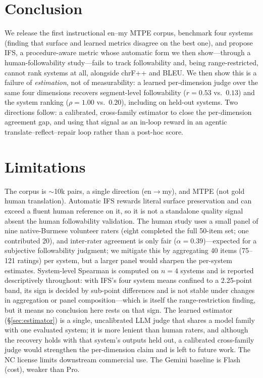 \documentclass[11pt]{article}
\begin{document}
\section{Conclusion}\label{sec:concl}
We release the first instructional en--my MTPE corpus, benchmark four systems (finding that
surface and learned metrics disagree on the best one), and propose IFS, a procedure-aware
metric whose automatic form we then show---through a human-followability study---fails to track
followability and, being range-restricted, cannot rank systems at all, alongside chrF++ and BLEU.
We then show this is a
failure of \emph{estimation}, not of measurability: a learned per-dimension judge over the same
four dimensions recovers segment-level followability ($r{=}0.53$ vs.\ $0.13$) and the system
ranking ($\rho{=}1.00$ vs.\ $0.20$), including on held-out systems. Two directions follow: a
calibrated, cross-family estimator to close the per-dimension agreement gap, and using that
signal as an in-loop reward in an agentic translate--reflect--repair loop rather than a post-hoc
score.

\section*{Limitations}
The corpus is $\sim$10k pairs, a single direction (en$\rightarrow$my), and MTPE (not gold
human translation). Automatic IFS rewards literal surface preservation and can exceed a
fluent human reference on it, so it is not a standalone quality signal absent the human
followability validation. The human study uses a small panel of nine native-Burmese
volunteer raters (eight completed the full 50-item set; one contributed 20), and inter-rater
agreement is only fair ($\alpha{=}0.39$)---expected for a subjective
followability judgment; we mitigate this by aggregating 40 items (75--121 ratings) per system,
but a larger panel would sharpen the per-system estimates. System-level Spearman is computed on
$n{=}4$ systems and is reported descriptively throughout: with IFS's four system means confined
to a 2.25-point band, its sign is decided by sub-point differences and is not stable under
changes in aggregation or panel composition---which is itself the range-restriction finding, but
it means no conclusion here rests on that sign. The learned estimator (\S\ref{sec:estimator})
is a single, uncalibrated LLM judge that shares a model family with one evaluated system; it is
more lenient than human raters, and although the recovery holds with that system's outputs held
out, a calibrated cross-family judge would strengthen the per-dimension claim and is left to
future work. The NC license limits downstream commercial use. The Gemini baseline is Flash
(cost), weaker than Pro.
\end{document}

